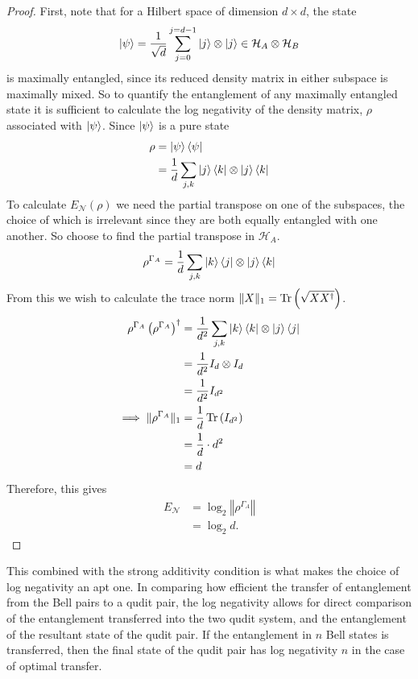\begin{proof}
    First, note that for a Hilbert space of dimension $d\times d$, the state
    \begin{equation}
        \ket{\psi} = \frac{1}{\sqrt{d}}\sum_{j=0}^{j=d-1}\ket{j}\otimes\ket{j}\in \mathcal{H}_A \otimes \mathcal{H}_B
    \end{equation}
    is maximally entangled, since its reduced density matrix in either subspace is maximally mixed.
    So to quantify the entanglement of any maximally entangled state it is sufficient to calculate the log negativity of the density matrix, $\rho$ associated with $\ket{\psi}$.
    Since $\ket{\psi}$ is a pure state
    \begin{align}
        \rho &= \ket{\psi}\bra{\psi}\\
        &=\frac{1}{d} \sum_{j,k}\ket{j}\bra{k}\otimes\ket{j}\bra{k}
    \end{align}
    To calculate $E_{\mathcal{N}}(\rho)$ we need the partial transpose on one of the subspaces, the choice of which is irrelevant since they are both equally entangled with one another.
    So choose to find the partial transpose in $\mathcal{H}_A$.
    \begin{align}
        \rho^{\Gamma_A} =\frac{1}{d} \sum_{j,k}\ket{k}\bra{j}\otimes\ket{j}\bra{k}
    \end{align}
    From this we wish to calculate the trace norm $\Vert X\Vert_1 = \operatorname{Tr}\left(\sqrt{XX^{\dagger}}\right)$.
    \begin{align}
        \rho^{\Gamma_A}\left(\rho^{\Gamma_A}\right)^{\dagger} &= \frac{1}{d^2} \sum_{j,k}\ket{k}\bra{k}\otimes\ket{j}\bra{j}\\
        &=\frac{1}{d^2}I_d\otimes I_d\\
        &=\frac{1}{d^2}I_{d^2}\\
        \implies \Vert\rho^{\Gamma_A}\Vert_1 &= \frac{1}{d}\operatorname{Tr}{\left(I_{d^2}\right)}\\
        &= \frac{1}{d}\cdot d^2\\
        &= d
    \end{align}
    Therefore, this gives
    \begin{align}
        E_{\mathcal{N}} &= \log_2\left\Vert \rho^{\Gamma_A}\right\Vert\\
        &= \log_2d.
    \end{align}
\end{proof}
This combined with the strong additivity condition is what makes the choice of log negativity an apt one.
In comparing how efficient the transfer of entanglement from the Bell pairs to a qudit pair, the log negativity allows for direct comparison of the entanglement transferred into the two qudit system, and the entanglement of the resultant state of the qudit pair.
If the entanglement in $n$ Bell states is transferred, then the final state of the qudit pair has log negativity $n$ in the case of optimal transfer.
